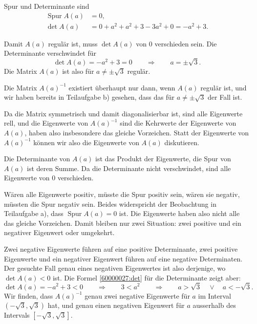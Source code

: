 \begin{loesung}
\begin{teilaufgaben}
\item Spur und Determinante sind
\begin{align}
\operatorname{Spur} A(a)
&=
0,
\label{60000027:tr}
\\
\det A(a)
&=
0 + a^2 + a^2 + 3 - 3 a^2 + 0
=
-a^2+3.
\label{60000027:det}
\end{align}
\item
Damit $A(a)$ regulär ist, muss $\det A(a)$
von $0$ verschieden sein.
Die Determinante verschwindet für
\[
\det A(a)
=
-a^2+3
=
0
\qquad
\Rightarrow
\qquad
a=\pm\sqrt{3}.
\]
Die Matrix $A(a)$ ist also für $a\ne\pm\sqrt{3}$ regulär.
\item
Die Matrix $A(a)^{-1}$ existiert überhaupt nur dann, wenn $A(a)$
regulär ist, und wir haben bereits in Teilaufgabe b) gesehen, dass
das für $a\ne\pm\sqrt{3}$ der Fall ist.

Da die Matrix symmetrisch und damit diagonalisierbar ist, sind alle
Eigenwerte rell, und die Eigenwerte von $A(a)^{-1}$ sind die
Kehrwerte der Eigenwerte von $A(a)$, haben also insbesondere
das gleiche Vorzeichen.
Statt der Eigenwerte von $A(a)^{-1}$ können wir also die Eigenwerte
von $A(a)$ diskutieren.

Die Determinante von $A(a)$ ist das Produkt der Eigenwerte, die Spur
von $A(a)$ ist deren Summe.
Da die Determinante nicht verschwindet, sind alle Eigenwerte von $0$
verschieden.

Wären alle Eigenwerte positiv, müsste die Spur positiv sein,
wären sie negativ, müssten die Spur negativ sein.
Beides widerspricht der Beobachtung in Teilaufgabe a), dass 
$\operatorname{Spur}A(a)=0$ ist.
Die Eigenwerte haben also nicht alle das gleiche Vorzeichen.
Damit bleiben nur zwei Situation: zwei positive und ein negativer
Eigenwert oder umgekehrt.

Zwei negative Eigenwerte führen auf eine positive Determinante,
zwei positive Eigenwerte und ein negativer Eigenwert führen auf
eine negative Determinaten.
Der gesuchte Fall genau eines negativen Eigenwertes ist also derjenige,
wo $\det A(a) <0$ ist.
Die Formel \eqref{60000027:det} für die Determinante zeigt aber:
\[
\det A(a) = -a^2 + 3 < 0
\qquad\Rightarrow\qquad
3 < a^2
\qquad\Rightarrow\qquad
a >\sqrt{3}\quad\vee\quad a < -\sqrt{3}.
\]
Wir finden, dass $A(a)^{-1}$ genau zwei negative Eigenwerte für $a$ im Interval
$(-\sqrt{3},\sqrt{3})$ hat, und genau einen negativen Eigenwert für
$a$ ausserhalb des Intervals $[-\sqrt{3},\sqrt{3}]$.
\qedhere
\end{teilaufgaben}
\end{loesung}

